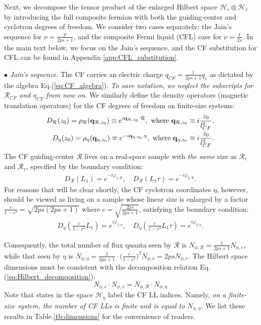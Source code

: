 Next, we decompose the tensor product of the enlarged Hilbert space $\mathcal H_e\otimes \mathcal H_v$ by introducing the full composite fermion with both the guiding-center and cyclotron degrees of freedom. We consider two cases separately: the Jain's sequence for $\nu=\frac{p}{2ps+1}$, and the composite Fermi liquid (CFL) case for $\nu=\frac{1}{2s}$. In the main text below, we focus on the Jain's sequence, and the CF substitution for CFL can be found in Appendix \ref{app:CFL_substitution}.

$\bullet$ \emph{Jain's sequence}.
The CF carries an electric charge $q_{CF}=\frac{1}{2ps+1} q_e$ as dictated by the algebra Eq.(\ref{eq:CF_algebra}). \emph{To save notation, we neglect the subscripts for $\mathcal R_{CF}$ and $\eta_{CF}$ from now on}. We similarly define the density operators (magnetic translation operators) for the CF degrees of freedom on finite-size systems:
\begin{align}
    D_{\mathcal R}(z_0)=\rho_{\mathcal R}(\mathbf q_{\mathcal R,z_0}) \equiv e^{i\mathbf q_{\mathcal R,z_0}\cdot \mathcal R},\text{ where }\mathbf q_{\mathcal R,z_0}\equiv i\frac{z_0}{l_{CF}^2},\notag \\
    D_{\eta}(z_0)=\rho_{\eta}(\mathbf q_{\eta,z_0}) \equiv e^{-i\mathbf q_{\eta,z_0}\cdot \eta},\text{ where }\mathbf q_{\eta,z_0}\equiv i\frac{z_0}{l_{CF}^2}.\label{eq:D_R_D_eta}
\end{align}
The CF guiding-center $\mathcal R$ lives on a real-space sample with \emph{the same} size as $\mathcal R_e$ and $\mathcal R_v$, specified by the boundary condition:
\begin{align}
    D_{\mathcal R}(L_1)=e^{-i\varphi_{1,\mathcal R}}, \quad D_{\mathcal R}(L_1\tau)=e^{-i\varphi_{2,\mathcal R}}.
\end{align}
For reasons that will be clear shortly, the CF cyclotron coordinates $\eta$, however, should be viewed as living on a sample whose linear size is enlarged by a factor $\frac{c}{1-c^2}=\sqrt{2ps(2ps+1)}$ where $c=\sqrt{\frac{2ps}{2ps+1}}$, satisfying the boundary condition:
\begin{align}
    D_{\eta}\left(\frac{c}{1-c^2}L_1\right)=e^{i\varphi_{1,\eta}},\quad D_{\eta}\left(\frac{c}{1-c^2}L_1\tau\right)=e^{i\varphi_{2,\eta}}.
\end{align}

Consequently, the total number of flux quanta seen by $\mathcal R$ is $N_{\phi,\mathcal R}=\frac{1}{2ps+1} N_{\phi,e}$, while that seen by $\eta$ is $N_{\phi,\eta}=\frac{1}{2ps+1}\cdot\big(\frac{c}{1-c^2}\big)^2 N_{\phi,e}=2psN_{\phi,e}$. The Hilbert space dimensions must be consistent with the decomposition relation Eq.(\ref{eq:Hilbert_decomposition}):
\begin{equation}
    N_{\phi,e}\cdot N_{\phi,v}=N_{\phi,\mathcal R}\cdot N_{\phi,\eta}
\end{equation}
Note that states in the space $\mathcal H_{\eta}$ label the CF LL indices. Namely, \emph{on a finite-size system, the number of CF LLs is finite and is equal to $N_{\phi,\eta}$.} We list these results in Table.\ref{tb:dimensions} for the convenience of readers.

